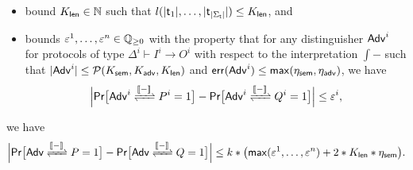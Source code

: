 \begin{lemma}
\begin{itemize}
\item bound $K_{\mathsf{len}} \in \mathbb{N}$ such that $l(|\mathsf{t}_1|,\ldots,|\mathsf{t}_{|\Sigma_\mathsf{t}|}|) \leq K_{\mathsf{len}}$, and

\item bounds $\varepsilon^1,\ldots,\varepsilon^n \in \mathbb{Q}_{\geq 0}$ with the property that for any distinguisher $\mathsf{Adv}^i$ for protocols of type $\Delta^i \vdash I^i \to O^i$ with respect to the interpretation $\int{-}$ such that $|\mathsf{Adv}^i| \leq \mathcal{P}(K_{\mathsf{sem}},K_{\mathsf{adv}},K_{\mathsf{len}})$ and $\mathsf{err}(\mathsf{Adv}^i) \leq \mathsf{max}(\eta_{\mathsf{sem}},\eta_{\mathsf{adv}})$, we have
\[\Big|\mathsf{Pr}\big[\interaction{\Adv^i}{P^i}{\int{-}} = 1\big] - \mathsf{Pr}\big[\interaction{\Adv^i}{Q^i}{\int{-}} = 1\big]\Big| \leq \varepsilon^i,\]
\end{itemize}
we have
\[\Big|\mathsf{Pr}\big[\interaction{\Adv}{P}{\int{-}} = 1\big] - \mathsf{Pr}\big[\interaction{\Adv}{Q}{\int{-}} = 1\big]\Big| \leq k * \big(\max(\varepsilon^1,\ldots,\varepsilon^n) + 2 * K_\length * \eta_\sem\big).\]
\end{lemma}

